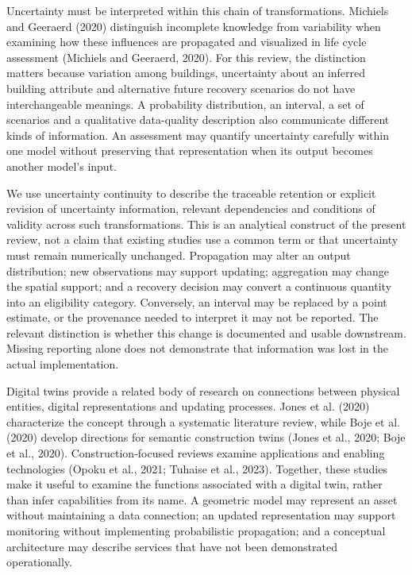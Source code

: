 Uncertainty must be interpreted within this chain of transformations. Michiels and Geeraerd (2020) distinguish incomplete knowledge from variability when examining how these influences are propagated and visualized in life cycle assessment (Michiels and Geeraerd, 2020). For this review, the distinction matters because variation among buildings, uncertainty about an inferred building attribute and alternative future recovery scenarios do not have interchangeable meanings. A probability distribution, an interval, a set of scenarios and a qualitative data-quality description also communicate different kinds of information. An assessment may quantify uncertainty carefully within one model without preserving that representation when its output becomes another model's input.

We use uncertainty continuity to describe the traceable retention or explicit revision of uncertainty information, relevant dependencies and conditions of validity across such transformations. This is an analytical construct of the present review, not a claim that existing studies use a common term or that uncertainty must remain numerically unchanged. Propagation may alter an output distribution; new observations may support updating; aggregation may change the spatial support; and a recovery decision may convert a continuous quantity into an eligibility category. Conversely, an interval may be replaced by a point estimate, or the provenance needed to interpret it may not be reported. The relevant distinction is whether this change is documented and usable downstream. Missing reporting alone does not demonstrate that information was lost in the actual implementation.

Digital twins provide a related body of research on connections between physical entities, digital representations and updating processes. Jones et al. (2020) characterize the concept through a systematic literature review, while Boje et al. (2020) develop directions for semantic construction twins (Jones et al., 2020; Boje et al., 2020). Construction-focused reviews examine applications and enabling technologies (Opoku et al., 2021; Tuhaise et al., 2023). Together, these studies make it useful to examine the functions associated with a digital twin, rather than infer capabilities from its name. A geometric model may represent an asset without maintaining a data connection; an updated representation may support monitoring without implementing probabilistic propagation; and a conceptual architecture may describe services that have not been demonstrated operationally.

